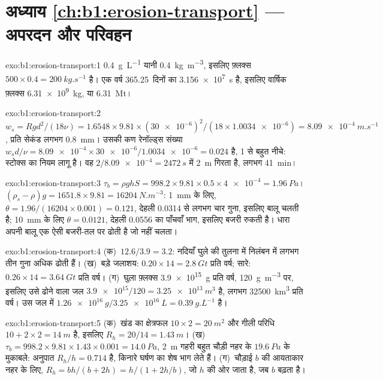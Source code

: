 \section*{अध्याय \ref{ch:b1:erosion-transport} --- अपरदन और परिवहन}

\begin{solution}{exo:b1:erosion-transport:1}
\qty{0.4}{g.L^{-1}} यानी \qty{0.4}{kg.m^{-3}}, इसलिए फ़्लक्स $500 \times 0.4 =
\qty{200}{kg.s^{-1}}$ है। एक वर्ष \num{365.25}~दिनों का \qty{3.156e7}{s} है, इसलिए वार्षिक फ़्लक्स
\qty{6.31e9}{kg}, या
\qty{6.31}{Mt}।
\end{solution}

\begin{solution}{exo:b1:erosion-transport:2}
$w_s = R g d^2/(18\nu) = 1.6548 \times 9.81 \times (\num{30e-6})^2/(18 \times
\num{1.0034e-6}) = \qty{8.09e-4}{m.s^{-1}}$, प्रति सेकंड लगभग \qty{0.8}{mm}। उसकी
कण रेनॉल्ड्स संख्या $w_s d/\nu = \num{8.09e-4} \times
\num{30e-6}/\num{1.0034e-6} = 0.024$ है, 1 से बहुत नीचे: स्टोक्स का नियम लागू है। वह
$2/\num{8.09e-4} = \qty{2472}{s}$ में \qty{2}{m} गिरता है, लगभग
\qty{41}{min}।
\end{solution}

\begin{solution}{exo:b1:erosion-transport:3}
$\tau_b = \rho g h S = 998.2 \times 9.81 \times 0.5 \times \num{4e-4} =
\qty{1.96}{Pa}$। $(\rho_s - \rho) g = 1651.8 \times 9.81 =
\qty{16204}{N.m^{-3}}$: \qty{1}{mm} के लिए, $\theta = 1.96/(16204 \times 0.001) =
0.121$, देहली \num{0.0314} से लगभग चार गुना, इसलिए बालू चलती है; \qty{10}{mm} के लिए
$\theta = 0.0121$, देहली \num{0.0556} का पाँचवाँ भाग, इसलिए बजरी रुकती है। धारा अपनी बालू एक ऐसी बजरी-तल पर ढोती है जो नहीं चलता।
\end{solution}

\begin{solution}{exo:b1:erosion-transport:4}
(क)~$12.6/3.9 = 3.2$: नदियाँ घुले की तुलना में निलंबन में लगभग तीन गुना अधिक ढोती हैं।
(ख)~बड़े जलाशय: $0.20 \times 14 = \qty{2.8}{Gt}$ प्रति वर्ष; सारे: $0.26 \times 14 = \qty{3.64}{Gt}$ प्रति वर्ष। (ग)~घुला फ़्लक्स \qty{3.9e15}{g} प्रति वर्ष, \qty{120}{g.m^{-3}} पर, इसलिए उसे ढोने वाला जल
$\num{3.9e15}/120 = \qty{3.25e13}{m^3}$ है, लगभग \qty{32500}{km^3} प्रति वर्ष। उस जल में 
$\qty{1.26e16}{g}/\qty{3.25e16}{L} =
\qty{0.39}{g.L^{-1}}$ है।
\end{solution}

\begin{solution}{exo:b1:erosion-transport:5}
(क)~खंड का क्षेत्रफल $10 \times 2 = \qty{20}{m^2}$ और गीली परिधि $10 + 2 \times 2 = \qty{14}{m}$ है, इसलिए $R_h = 20/14 = \qty{1.43}{m}$।
(ख)~$\tau_b = 998.2 \times 9.81 \times 1.43 \times 0.001 = \qty{14.0}{Pa}$, \qty{2}{m} गहरी बहुत चौड़ी नहर के $\qty{19.6}{Pa}$ के मुकाबले: अनुपात $R_h/h = 0.714$ है, किनारे घर्षण का शेष भाग लेते हैं। (ग)~चौड़ाई $b$ की आयताकार नहर के लिए, $R_h = bh/(b + 2h) = h/(1 + 2h/b)$, जो $h$ की ओर जाता है, जब $b$ बढ़ता है।
\end{solution}

